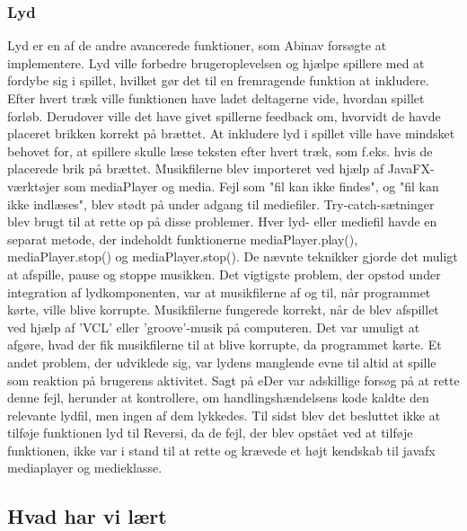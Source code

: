 \subsubsection{Lyd}\label{lyd}
Lyd er en af de andre avancerede funktioner, som Abinav forsøgte at implementere. Lyd ville forbedre brugeroplevelsen og hjælpe spillere med at fordybe sig i spillet, hvilket gør det til en fremragende funktion at inkludere. Efter hvert træk ville funktionen have ladet deltagerne vide, hvordan spillet forløb. Derudover ville det have givet spillerne feedback om, hvorvidt de havde placeret brikken korrekt på brættet. At inkludere lyd i spillet ville have mindsket behovet for, at spillere skulle læse teksten efter hvert træk, som f.eks. hvis de placerede brik på brættet.
Musikfilerne blev importeret ved hjælp af JavaFX-værktøjer som mediaPlayer og media. Fejl som "fil kan ikke findes", og "fil kan ikke indlæses", blev stødt på under adgang til mediefiler. Try-catch-sætninger blev brugt til at rette op på disse problemer. Hver lyd- eller mediefil havde en separat metode, der indeholdt funktionerne mediaPlayer.play(), mediaPlayer.stop() og mediaPlayer.stop(). De nævnte teknikker gjorde det muligt at afspille, pause og stoppe musikken. Det vigtigste problem, der opstod under integration af lydkomponenten, var at musikfilerne af og til, når programmet kørte, ville blive korrupte. Musikfilerne fungerede korrekt, når de blev afspillet ved hjælp af 'VCL' eller 'groove'-musik på computeren. Det var umuligt at afgøre, hvad der fik musikfilerne til at blive korrupte, da programmet kørte. Et andet problem, der udviklede sig, var lydens manglende evne til altid at spille som reaktion på brugerens aktivitet. Sagt på eDer var adskillige forsøg på at rette denne fejl, herunder at kontrollere, om handlingshændelsens kode kaldte den relevante lydfil, men ingen af dem lykkedes. Til sidst blev det besluttet ikke at tilføje funktionen lyd til Reversi, da de fejl, der blev opstået ved at tilføje funktionen, ikke var i stand til at rette og krævede et højt kendskab til javafx mediaplayer og medieklasse.


\subsection{Hvad har vi lært}
